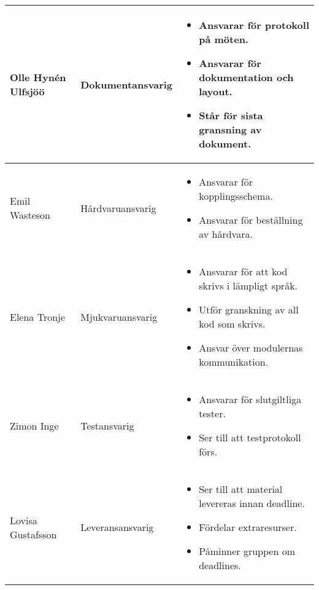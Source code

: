 \documentclass[11pt]{article}
\begin{document}
\begin{flushleft}
\begin{longtable}{| p{.2\linewidth} | p{.2\linewidth} | p{.5\linewidth} |}
Olle Hynén Ulfsjöö & Dokumentansvarig & \vspace{-\baselineskip}
\begin{itemize}[label={--},leftmargin=*,nosep]
\item Ansvarar för protokoll på möten.
\item Ansvarar för dokumentation och layout.
\item Står för sista gransning av dokument.
\vspace{-\baselineskip}
\end{itemize}
\\ \hline

Emil Wasteson & Hårdvaruansvarig & \vspace{-\baselineskip}
\begin{itemize}[label={--},leftmargin=*,nosep]
\item Ansvarar för kopplingsschema.
\item Ansvarar för beställning av hårdvara.
\vspace{-\baselineskip}
\end{itemize}
\\ \hline

Elena Tronje & Mjukvaruansvarig & \vspace{-\baselineskip}
\begin{itemize}[label={--},leftmargin=*,nosep]
\item Ansvarar för att kod skrivs i lämpligt språk.
\item Utför granskning av all kod som skrivs.
\item Ansvar över modulernas kommunikation.
\vspace{-\baselineskip}
\end{itemize}
\\ \hline

Zimon Inge & Testansvarig & \vspace{-\baselineskip}
\begin{itemize}[label={--},leftmargin=*,nosep]
\item Ansvarar för slutgiltliga tester.
\item Ser till att testprotokoll förs.
\vspace{-\baselineskip}
\end{itemize}
\\ \hline

Lovisa Gustafsson & Leveransansvarig & \vspace{-\baselineskip}
\begin{itemize}[label={--},leftmargin=*,nosep]
\item Ser till att material levereras innan deadline.
\item Fördelar extraresurser.
\item Påminner gruppen om deadlines.
\vspace{-\baselineskip}
\end{itemize}
\\ \hline


\end{longtable}
\end{flushleft}
\end{document}
